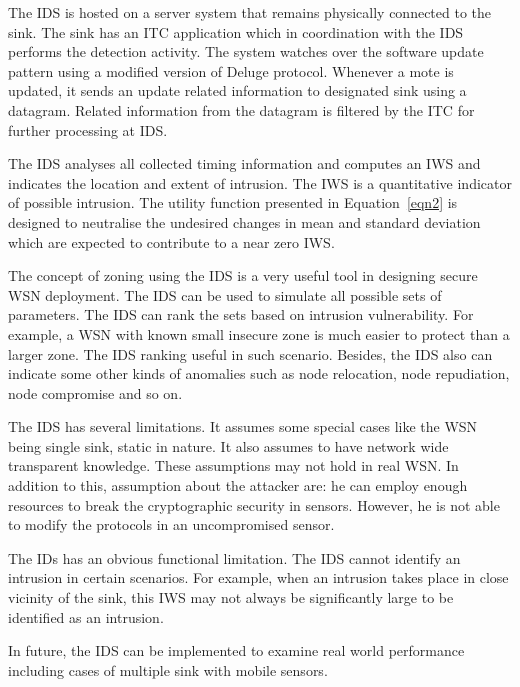\documentclass[conference]{IEEEtran}
\begin{document}
The IDS is hosted on a server system that remains physically connected to the  sink. 
The sink has an ITC application which in coordination with the IDS performs the detection activity.
The system watches over the software update pattern using a modified version of Deluge protocol.
Whenever a mote is updated, it sends an update related information to designated sink using a datagram.  
Related information from the datagram is filtered by the ITC for further processing at IDS.

The IDS analyses all collected timing information and computes an IWS and indicates the location and extent of intrusion.
The IWS is a quantitative indicator of possible intrusion.
The utility function presented in Equation~\ref{eqn2} is designed to neutralise the undesired %
changes in mean and standard deviation which are expected to contribute to a near zero IWS.


The concept of zoning using the IDS is a very useful tool in designing secure WSN deployment.
The IDS can be used to simulate all possible sets of parameters.
The IDS can rank the sets based on intrusion vulnerability.
For example, a WSN with known small insecure zone is much easier to protect than a larger zone.
The IDS ranking useful in such scenario.
Besides, the IDS also can indicate some other kinds of anomalies such as node relocation, node repudiation, node compromise and so on.

The IDS has several limitations. 
It assumes some special cases like the WSN being single sink, static in nature.
It also assumes to have network wide transparent knowledge.
These assumptions may not hold in real WSN.
In addition to this, assumption about the attacker are: he can employ enough resources to break the cryptographic security in sensors.
However, he is not able to modify the protocols in an uncompromised sensor.

The IDs has an obvious functional limitation.
The IDS cannot identify an intrusion in certain scenarios.
For example, when an intrusion takes place in close vicinity of the sink, this IWS may not always be significantly large to be identified as an intrusion. 

In future,  the IDS can be implemented to examine real world performance including cases of multiple sink with mobile sensors.






\IEEEtriggercmd{\enlargethispage{-5in}}






\end{document}
